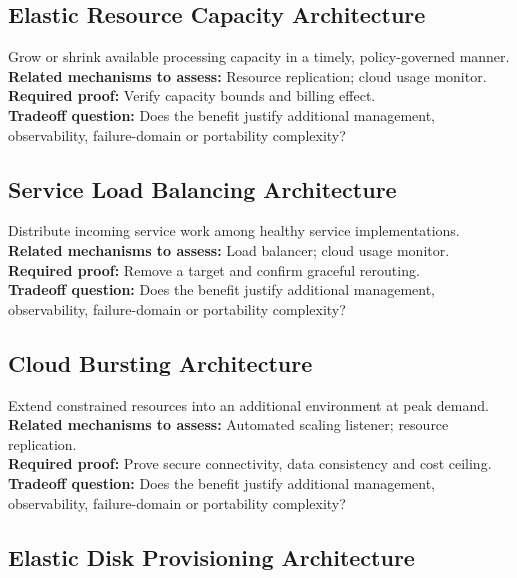 \documentclass[10pt,letterpaper]{article}
\begin{document}
\subsection{Elastic Resource Capacity Architecture}
Grow or shrink available processing capacity in a timely, policy-governed manner.\\[3pt]
\textbf{Related mechanisms to assess:} Resource replication; cloud usage monitor.\\[3pt]
\textbf{Required proof:} Verify capacity bounds and billing effect.\\[3pt]
\textbf{Tradeoff question:} Does the benefit justify additional management, observability, failure-domain or portability complexity?\\[3pt]
\subsection{Service Load Balancing Architecture}
Distribute incoming service work among healthy service implementations.\\[3pt]
\textbf{Related mechanisms to assess:} Load balancer; cloud usage monitor.\\[3pt]
\textbf{Required proof:} Remove a target and confirm graceful rerouting.\\[3pt]
\textbf{Tradeoff question:} Does the benefit justify additional management, observability, failure-domain or portability complexity?\\[3pt]
\subsection{Cloud Bursting Architecture}
Extend constrained resources into an additional environment at peak demand.\\[3pt]
\textbf{Related mechanisms to assess:} Automated scaling listener; resource replication.\\[3pt]
\textbf{Required proof:} Prove secure connectivity, data consistency and cost ceiling.\\[3pt]
\textbf{Tradeoff question:} Does the benefit justify additional management, observability, failure-domain or portability complexity?\\[3pt]
\subsection{Elastic Disk Provisioning Architecture}
\end{document}

